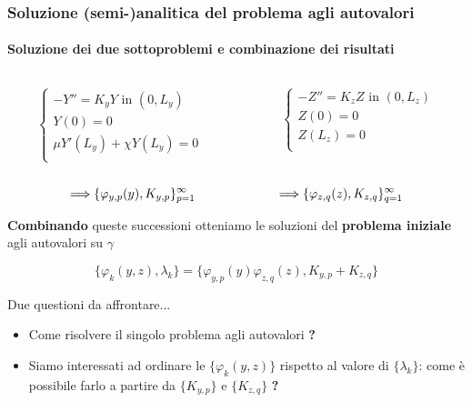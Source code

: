  \begin{frame}
 \frametitle{Soluzione (semi-)analitica del problema agli autovalori}
 \framesubtitle{Soluzione dei due sottoproblemi e combinazione dei risultati}
 \begin{columns}
 \footnotesize
  \begin{column}{0.5\textwidth}
  \begin{equation}
  \begin{cases}
   -Y''=K_yY \text{ in }(0,L_y)\\
   Y(0)=0\\
   \mu Y'(L_y)+\chi Y(L_y)=0\\
  \end{cases}
 \end{equation}
 \end{column}
  \begin{column}{0.5\textwidth}
      \begin{equation}
  \begin{cases}
   -Z''= K_zZ\text{ in }(0,L_z)\\
   Z(0)=0\\
   Z(L_z)=0\\   
  \end{cases}
 \end{equation}
\end{column}
\end{columns}

\begin{alertblock}{}
  $$\Longrightarrow\{\varphi_{y,p}(y),K_{y,p}\}_{p=1}^\infty\psp{38}\Longrightarrow\{\varphi_{z,q}(z),K_{z,q}\}_{q=1}^\infty$$
\end{alertblock}

\textbf{Combinando} queste successioni otteniamo le 
 soluzioni del \textbf{problema iniziale} agli autovalori su $\gamma$
 \begin{alertblock}{}
 \begin{equation}
  \{\varphi_k(y,z),\lambda_k\}=\{\varphi_{y,p}(y)\varphi_{z,q}(z),K_{y,p}+K_{z,q}\}
 \end{equation}
 \end{alertblock}
 Due questioni da affrontare...
 \begin{itemize}
  \item Come risolvere il singolo problema agli autovalori \textbf{?}
  \item Siamo interessati ad ordinare le $\{\varphi_k(y,z)\}$ rispetto al valore di $\{\lambda_k\}$: come \`e possibile farlo
a partire da $\{K_{y,p}\}$ e $\{K_{z,q}\}$ \textbf{?}
 \end{itemize}
 \end{frame}
